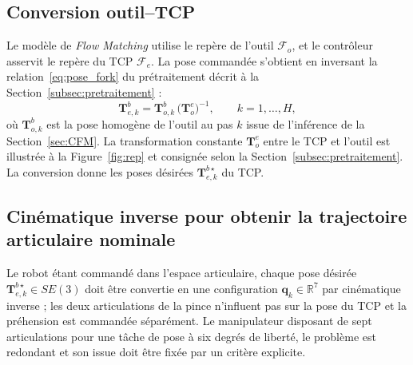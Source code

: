 \subsection{Conversion outil--\acs{TCP}}
Le modèle de \textit{Flow Matching} utilise le repère de l'outil $\mathcal{F}_o$, et le contrôleur asservit le repère du \ac{TCP} $\mathcal{F}_e$. La pose commandée s'obtient en inversant la relation~\eqref{eq:pose_fork} du prétraitement décrit à la Section~\ref{subsec:pretraitement} :
\begin{equation}\label{eq:tcp_from_tool}
  \mathbf{T}_{e,k}^{b} = \mathbf{T}_{o,k}^{b}\,\bigl(\mathbf{T}_{o}^{e}\bigr)^{-1}, \qquad k=1,\dots,H,
\end{equation}
où $\mathbf{T}_{o,k}^{b}$ est la pose homogène de l'outil au pas $k$ issue de l'inférence de la Section~\ref{sec:CFM}. La transformation constante $\mathbf{T}_{o}^{e}$ entre le \ac{TCP} et l'outil est illustrée à la Figure~\ref{fig:rep} et consignée selon la Section~\ref{subsec:pretraitement}. La conversion donne les poses désirées $\mathbf{T}_{e,k}^{b\star}$ du \ac{TCP}.

\subsection{Cinématique inverse pour obtenir la trajectoire articulaire nominale}\label{subsec:ik}
Le robot étant commandé dans l'espace articulaire, chaque pose désirée $\mathbf{T}_{e,k}^{b\star}\in SE(3)$ doit être convertie en une configuration $\mathbf{q}_k\in\mathbb{R}^7$ par cinématique inverse ; les deux articulations de la pince n'influent pas sur la pose du \ac{TCP} et la préhension est commandée séparément. Le manipulateur disposant de sept articulations pour une tâche de pose à six degrés de liberté, le problème est redondant et son issue doit être fixée par un critère explicite.

